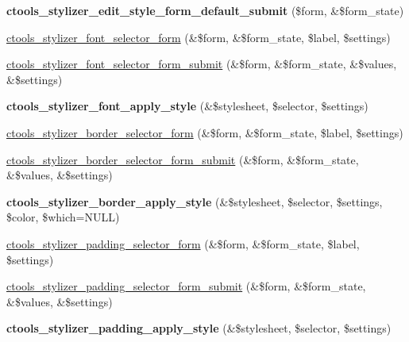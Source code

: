 \begin{DoxyCompactItemize}
\item 
\hypertarget{includes_2stylizer_8inc_a29425be835cbd847dbcb989d846797cd}{
{\bfseries ctools\_\-stylizer\_\-edit\_\-style\_\-form\_\-default\_\-submit} (\$form, \&\$form\_\-state)}
\label{includes_2stylizer_8inc_a29425be835cbd847dbcb989d846797cd}

\item 
\hyperlink{includes_2stylizer_8inc_a7c2c003ec6849b26ab45b7b28af3f311}{ctools\_\-stylizer\_\-font\_\-selector\_\-form} (\&\$form, \&\$form\_\-state, \$label, \$settings)
\item 
\hyperlink{includes_2stylizer_8inc_a82a6b3afe1fbd52197afa3dceb692d78}{ctools\_\-stylizer\_\-font\_\-selector\_\-form\_\-submit} (\&\$form, \&\$form\_\-state, \&\$values, \&\$settings)
\item 
\hypertarget{includes_2stylizer_8inc_a8f929b02a77e6f65703bbb5831a2b78e}{
{\bfseries ctools\_\-stylizer\_\-font\_\-apply\_\-style} (\&\$stylesheet, \$selector, \$settings)}
\label{includes_2stylizer_8inc_a8f929b02a77e6f65703bbb5831a2b78e}

\item 
\hyperlink{includes_2stylizer_8inc_a4e108b363a7b52c178f472b6927a0681}{ctools\_\-stylizer\_\-border\_\-selector\_\-form} (\&\$form, \&\$form\_\-state, \$label, \$settings)
\item 
\hyperlink{includes_2stylizer_8inc_a7443b42b0b3b1e2fdebe47649d2256d6}{ctools\_\-stylizer\_\-border\_\-selector\_\-form\_\-submit} (\&\$form, \&\$form\_\-state, \&\$values, \&\$settings)
\item 
\hypertarget{includes_2stylizer_8inc_a5448c2aad416c99a403cb441b5deafae}{
{\bfseries ctools\_\-stylizer\_\-border\_\-apply\_\-style} (\&\$stylesheet, \$selector, \$settings, \$color, \$which=NULL)}
\label{includes_2stylizer_8inc_a5448c2aad416c99a403cb441b5deafae}

\item 
\hyperlink{includes_2stylizer_8inc_aa5ca96ac129122fb2201f6ef314ba77a}{ctools\_\-stylizer\_\-padding\_\-selector\_\-form} (\&\$form, \&\$form\_\-state, \$label, \$settings)
\item 
\hyperlink{includes_2stylizer_8inc_a8283438629f3189d0669329513a61b46}{ctools\_\-stylizer\_\-padding\_\-selector\_\-form\_\-submit} (\&\$form, \&\$form\_\-state, \&\$values, \&\$settings)
\item 
\hypertarget{includes_2stylizer_8inc_aa21cdf212956b6a93f84de0403535e90}{
{\bfseries ctools\_\-stylizer\_\-padding\_\-apply\_\-style} (\&\$stylesheet, \$selector, \$settings)}
\label{includes_2stylizer_8inc_aa21cdf212956b6a93f84de0403535e90}

\end{DoxyCompactItemize}


